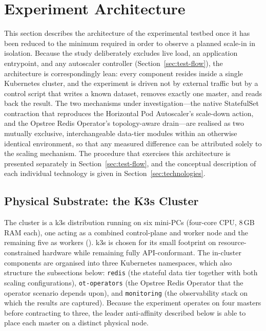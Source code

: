 \newpage
\section{Experiment Architecture}
\label{sec:architecture}

This section describes the architecture of the experimental testbed once it has been
reduced to the minimum required in order to observe a planned scale-in in isolation.
Because the study deliberately excludes live load, an application entrypoint, and any
autoscaler controller (Section~\ref{sec:test-flow}), the architecture is correspondingly
lean: every component resides inside a single Kubernetes cluster, and the experiment is
driven not by external traffic but by a control script that writes a known dataset, removes
exactly one master, and reads back the result. The two mechanisms under
investigation---the native StatefulSet contraction that reproduces the Horizontal Pod
Autoscaler's scale-down action, and the Opstree Redis Operator's topology-aware
drain---are realised as two mutually exclusive, interchangeable data-tier modules within an
otherwise identical environment, so that any measured difference can be attributed solely
to the scaling mechanism. The procedure that exercises this architecture is presented
separately in Section~\ref{sec:test-flow}, and the conceptual description of each individual
technology is given in Section~\ref{sec:technologies}.

\subsection{Physical Substrate: the K3s Cluster}
\label{subsec:cluster-substrate}

The cluster is a k3s distribution running on six mini-PCs (four-core CPU, 8\,GB
RAM each), one acting as a combined control-plane and worker node and the remaining five as
workers (\cite{k3s:docs}). k3s is chosen for its small footprint on resource-constrained
hardware while remaining fully API-conformant. The in-cluster components are organised into
three Kubernetes namespaces, which also structure the subsections below: \texttt{redis} (the
stateful data tier together with both scaling configurations), \texttt{ot-operators} (the
Opstree Redis Operator that the operator scenario depends upon), and \texttt{monitoring}
(the observability stack on which the results are captured). Because the experiment operates
on four masters before contracting to three, the leader anti-affinity described below is able
to place each master on a distinct physical node.

